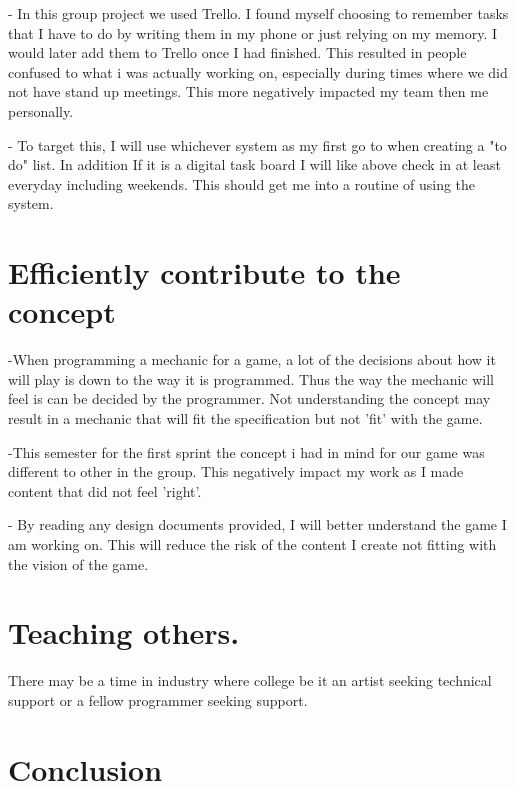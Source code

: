 \documentclass{scrartcl}
\begin{document}
- In this group project we used Trello. I found myself choosing to remember tasks that I have to do by writing them in my phone or just relying on my memory. I would later add them to Trello once I had finished. This resulted in people confused to what i was actually working on, especially during times where we did not have stand up meetings. This more negatively impacted my team then me personally.

- To target this, I will use whichever system as my first go to when creating a "to do" list. In addition If it is a digital task board I will like above check in at least everyday including weekends. This should get me into a routine of using the system. 


\section{Efficiently contribute to the concept}
-When programming a mechanic for a game, a lot of the decisions about how it will play is down to the way it is programmed. Thus the way the mechanic will feel is can be decided by the programmer.  Not understanding the concept may result in a mechanic that will fit the specification but not 'fit' with the game.

-This semester for the first sprint the concept i had in mind for our game was different to other in the group. This negatively impact my work as I made content that did not feel 'right'. 

- By reading any design documents provided, I will better understand the game I am working on. This will reduce the risk of the content I create not fitting with the vision of the game. 


\section{Teaching others.}
There may be a time in industry where college be it an artist seeking technical support or a fellow programmer seeking support.




\section{Conclusion}




\end{document}
